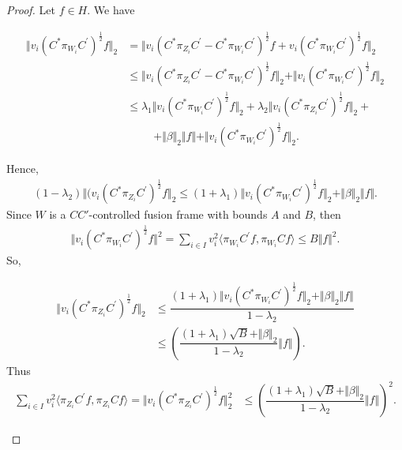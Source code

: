 \documentclass{mfatshort}
\begin{document}
\begin{proof}
Let $f \in H$. We have
\begin{small}
\begin{align*}
\Vert v_{i}( C^{*} \pi_{{W}_{i}}C^{\prime})^\frac{1}{2}f \Vert_{2}&=\Vert v_{i}(C^{*}\pi_{{Z}_{i}}C^{\prime}-C^{*}\pi_{W_{i}} C^{\prime})^{\frac{1}{2}}f+v_{i}(C ^{*}\pi_{W_{i}} C^{\prime})^{\frac{1}{2}}f\Vert_{2}\\
&\leq \Vert v_{i}(C^{*} \pi_{{Z}_{i}}C^{\prime}-C ^{*}\pi_{W_{i}}C^{\prime})^{\frac{1}{2}}f \Vert_{2} +\Vert v_{i}(C^{*}\pi_{W_{i}}C^{\prime})^{\frac{1}{2}}f \Vert_{2}\\
&\leq \lambda _{1}\Vert v_{i}(C^{*}\pi_{W_{i}} C^{\prime})^{\frac{1}{2}}f \Vert_{2}+\lambda _{2}\Vert v_i(C^* \pi_{Z_{i}}C^{\prime})^{\frac{1}{2}}f \Vert_{2}+ \\
&\ \ \ \ \ \ \ \ \ \ \ +\Vert\beta\Vert_{2}\Vert f \Vert+
\Vert v_{i}(C^{*}\pi_{W_{i}} C^{\prime})^{\frac{1}{2}}f \Vert_{2}.
\end{align*}
\end{small}
Hence,
\begin{align*}
(1-\lambda_{2})\Vert (v_{i} (C^{*} \pi_{{Z}_{i}}C^{\prime})^{\frac{1}{2}}f \Vert_{2}\leq(1+\lambda_{1})\Vert v_{i}(C ^{*}\pi_{W_{i}} C^{\prime})^{\frac{1}{2}}f \Vert_{2}+\Vert\beta\Vert_{2}\Vert f \Vert.
\end{align*}
Since $W$ is a $CC'$-controlled fusion frame with bounds $A$ and $B$, then
\begin{align*}
\Vert v_{i}(C^{*}\pi_{W_{i}}C^{\prime})^{\frac{1}{2}}f \Vert^{2}
=\sum _{i \in I} v_{i}^{2}\langle \pi_{W_{i}}  C^{\prime}f, \pi _{W_{i}} C f\rangle
\leq B \Vert f \Vert^{2}.
\end{align*}
So,
\begin{small}
\begin{align*}
\Vert v_{i} (C^{*} \pi_{{Z}_{i}}C^{\prime})^{\frac{1}{2}}f \Vert_{2}&\leq\dfrac{(1+\lambda_{1})\Vert v_{i}(C^{*}\pi_{W_{i}} C^{\prime})^{\frac{1}{2}}f \Vert_{2}+\Vert\beta\Vert_{2}\Vert f \Vert }{1-\lambda_{2}}\\
&\leq(\dfrac{(1+\lambda_{1})\sqrt{B} +\Vert\beta\Vert_{2} }{1-\lambda_{2}}\Vert f \Vert).
\end{align*}
Thus
\begin{align*}
\sum _{i \in I} v_{i}^{2}\langle \pi_{Z_{i}}  C^{\prime}f, \pi _{Z_{i}} C f\rangle=\Vert v_{i} (C^{*} \pi_{{Z}_{i}}C^{\prime})^{\frac{1}{2}}f \Vert^{2}_{2}&\leq(\dfrac{(1+\lambda_{1})\sqrt{B} +\Vert\beta\Vert_{2} }{1-\lambda_{2}}\Vert f \Vert)^{2}.
\end{align*}

\end{small}
\end{proof}
\end{document}
